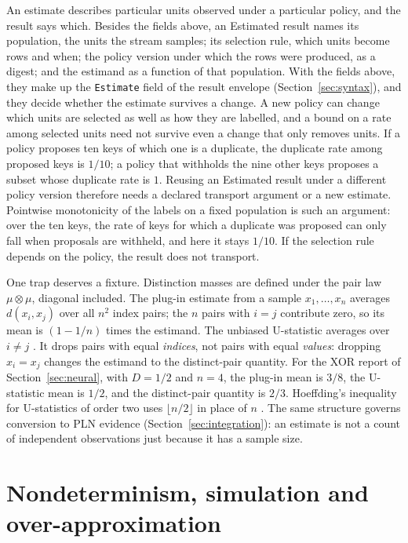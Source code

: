 \documentclass[11pt]{article}
\newcommand{\code}[1]{\texttt{#1}}
\theoremstyle{definition}
\theoremstyle{plain}
\begin{document}
An estimate describes particular units observed under a particular policy, and the result says
which. Besides the fields above, an Estimated result names its population, the units the stream
samples; its selection rule, which units become rows and when; the policy version under which the
rows were produced, as a digest; and the estimand as a function of that population. With the fields
above, they make up the \code{Estimate} field of the result envelope (Section~\ref{sec:syntax}), and
they decide whether the estimate survives a change. A new policy can change which units are selected as
well as how they are labelled, and a bound on a rate among selected units need not survive even a
change that only removes units. If a policy proposes ten keys of which one is a duplicate, the
duplicate rate among proposed keys is $1/10$; a policy that withholds the nine other keys proposes
a subset whose duplicate rate is $1$. Reusing an Estimated result under a different policy version
therefore needs a declared transport argument or a new estimate. Pointwise monotonicity of the
labels on a fixed population is such an argument: over the ten keys, the rate of keys for which a
duplicate was proposed can only fall when proposals are withheld, and here it stays $1/10$. If the
selection rule depends on the policy, the result does not transport.

One trap deserves a fixture. Distinction masses are defined under the pair law $\mu\otimes\mu$,
diagonal included. The plug-in estimate from a sample $x_1,\dots,x_n$ averages $d(x_i,x_j)$ over
all $n^2$ index pairs; the $n$ pairs with $i=j$ contribute zero, so its mean is $(1-1/n)$ times the
estimand. The unbiased U-statistic averages over $i\ne j$ \cite{hoeffding48}. It drops pairs with
equal \emph{indices}, not pairs with equal \emph{values}: dropping $x_i=x_j$ changes the estimand to
the distinct-pair quantity. For the XOR report of Section~\ref{sec:neural}, with $D=1/2$ and $n=4$,
the plug-in mean is $3/8$, the U-statistic mean is $1/2$, and the distinct-pair quantity is $2/3$.
Hoeffding's inequality for U-statistics of order two uses $\lfloor n/2\rfloor$ in place of $n$
\cite{hoeffding63}. The same structure governs conversion to PLN evidence
(Section~\ref{sec:integration}): an estimate is not a count of independent observations just
because it has a sample size.

\section{Nondeterminism, simulation and over-approximation}\label{sec:nondet}
\end{document}
